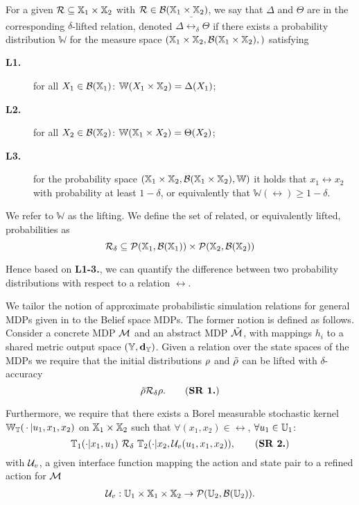 \documentclass{ifacconf}
\begin{document}
For a given 
	$\mathcal{R}\subseteq {\mathbb{X}}_1\times {\mathbb{X}}_2$ with $\mathcal{R}\in \mathcal B({\mathbb{X}}_1\times {\mathbb{X}}_2)$, we say that  $\Delta$ and $ \Theta$ are in the corresponding $\delta$-lifted relation, denoted $\Delta \bar \rel_\delta \Theta$  if there exists a probability distribution $\mathbb W$ for the measure space $({\mathbb{X}}_1\times {\mathbb{X}}_2,\mathcal B({\mathbb{X}}_1\times {\mathbb{X}}_2),)$
	satisfying { \setlength{\parskip}{-1pt}\setlength{\parsep}{0pt}
		\begin{description}
			\item[\textbf{L1.}] for all $X_1\in \mathcal{B}({\mathbb{X}}_1)$: $\mathbb W(X_1\times {\mathbb{X}}_2)=\Delta(X_1)$;
			\item [\textbf{L2.}] for all $X_2\in \mathcal{B}({\mathbb{X}}_2)$:  $\mathbb W({\mathbb{X}}_1\times X_2)=\Theta(X_2)$;
			\item[\textbf{L3.}] for the probability space  $({\mathbb{X}}_1\times {\mathbb{X}}_2,\mathcal B({\mathbb{X}}_1\times {\mathbb{X}}_2), \mathbb W)$ it holds that
			$x_1\rel x_2$ with probability at least $1-\delta$, or equivalently that $\mathbb{W}\left(\rel\right)\geq1-\delta$.
	\end{description}}%
	
We refer to  $\mathbb W$ as the lifting. We define 
the set of related, or equivalently lifted, probabilities as 
	\[\relax\mathcal{R}_\delta\subseteq \mathcal{P}({\mathbb{X}}_1,\mathcal B({\mathbb{X}}_1))\times \mathcal{P}({\mathbb{X}}_2,\mathcal B({\mathbb{X}}_2))\] 


Hence based on \textbf{L1-3.}, we can quantify the difference between two probability distributions with respect to a relation $\rel$.

 
We tailor the   notion of approximate probabilistic simulation relations for general MDPs given in \citep{haesaert2017verification} to the Belief space MDPs.
  The former notion is defined as follows. 
Consider a concrete MDP $\mathcal{M}$ and an abstract  MDP $\tilde{\mathcal{M}}$, with mappings $h_i$ to a shared {metric} output space  $({\mathbb{Y}},\mathbf{d}_{\mathbb{Y}})$.  
Given a relation over the state spaces of the MDPs we require that the initial distributions $\rho$ and $\tilde{\rho}$ can be lifted with $\delta$-accuracy
\begin{equation}
\tilde\init \bar \rel_\delta \init.
	\tag{\textbf{SR 1.}}
\end{equation}
  
Furthermore, we require that there exists a Borel measurable stochastic kernel $\mathbb{W}_{\mathbb{T}}(\,\cdot\,{\mid} u_1,x_1,x_2)$ on ${\mathbb{X}}_1\times{\mathbb{X}}_2$ such that $\forall (x_1,x_2)\in \rel$, $\forall u_1\in{\mathbb{U}}_1$:
\begin{equation}\mathbb T_1(\cdot| x_1, u_1)\ \bar \rel_\delta \  \mathbb T_2(\cdot| x_2, \InF(u_1,x_1,x_2)),\tag{\textbf{SR 2.}}\end{equation} with $\mathcal{U}_{v}$, a given interface function mapping the action and state pair to a refined action for $\mathcal{M}$
\begin{align*}\mathcal{U}_{v}: {\mathbb{U}}_1\times {\mathbb{X}}_1\times{\mathbb{X}}_2 \rightarrow \mathcal{P}({\mathbb{U}}_2,\mathcal B({\mathbb{U}}_2)). \end{align*}
\end{document}
